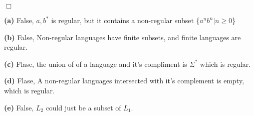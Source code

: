 \documentclass[11pt]{article}
\newcommand{\question}[2] {\vspace{.25in} \fbox{#1} #2 \vspace{.10in}}
\renewcommand{\part}[1] {\vspace{.10in} {\bf (#1)}}
\begin{document}
\indent $\Box$

\question{4}{}

 \part{a} False, {${a,b}^*$} is regular, but it contains a non-regular subset \{$a^n b^n | n \geq 0 $\}

 \part{b} False,  Non-regular languages have finite subsets, and finite languages are regular.

 \part{c} Flase, the union of of a language and it's compliment is ${\Sigma}^{*}$ which is regular.

 \part{d} Flase, A non-regular languages intersected with it's complement is empty, which is regular.

 \part{e} False, ${L}_{2}$ could just be a subset of ${L}_{1}$.
\end{document}
